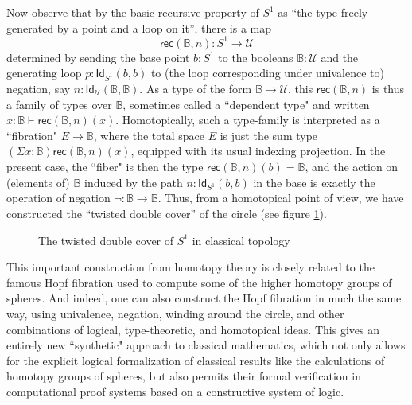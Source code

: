 \documentclass[11pt]{article}
\newcommand{\B}{\ensuremath{\mathbb{B}}}
\newcommand{\Id}{\mathsf{Id}}
\newcommand{\id}[1]{\Id_{#1}}
\newcommand{\rec}{\mathsf{rec}}
\newcommand{\U}{\ensuremath{\mathcal{U}}}
\theoremstyle{remark}
\theoremstyle{definition}
\begin{document}
Now observe that by the basic recursive property of $S^1$ as ``the type freely generated by a point and a loop on it'', there is a map $$\rec(\B,n): S^1 \to \U$$ determined by sending the base point $b:S^1$ to the booleans $\B:\U$ and the generating loop $p : \id{S^1}(b,b)$ to (the loop corresponding under univalence to) negation, say $n : \id{\U}(\B,\B)$.  As a type of the form $\B\to\U$, this $\rec(\B,n)$ is thus a family of types over $\B$, sometimes called a ``dependent type" and written $x:\B \vdash \rec(\B,n)(x)$.  Homotopically, such a type-family is interpreted as a ``fibration" $E\to\B$, where the total space $E$ is just the sum type $(\Sigma{x:\B})\rec(\B,n)(x)$, equipped with its usual indexing projection.  In the present case, the ``fiber" is then the type $\rec(\B,n)(b) = \B$, and the action on (elements of) $\B$ induced by the path $n: \id{S^1}(b,b)$ in the base is exactly the operation of negation $\neg : \B\to \B$.  Thus, from a homotopical point of view, we have constructed the ``twisted double cover'' of the circle (see figure \ref{fig:winding}).
\begin{figure}\centering
  \caption{The twisted double cover of $S^1$ in classical topology}\label{fig:winding}
\end{figure}
%
This important construction from homotopy theory is closely related to the famous Hopf fibration used to compute some of the higher homotopy groups of spheres.  And indeed,  one can also construct the Hopf fibration in much the same way, using univalence, negation, winding around the circle, and other combinations of logical, type-theoretic, and homotopical ideas.  This gives an entirely new ``synthetic" approach to classical mathematics, which not only allows for the explicit logical formalization of classical results like the calculations of homotopy groups of spheres, but also permits their formal verification in computational proof systems based on a constructive system of logic.
\end{document}
